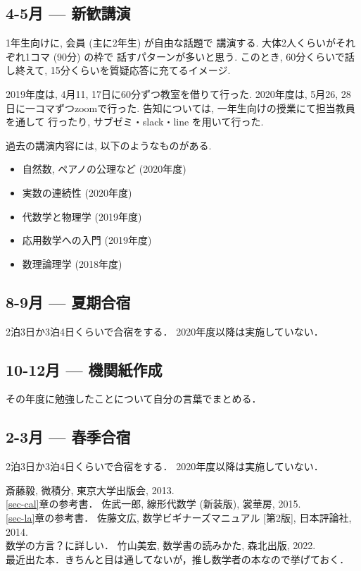 \documentclass[11pt, a4paper, dvipdfmx]{jsarticle}
\theoremstyle{definition}
\theoremstyle{mystyle}
\numberwithin{equation}{section} %
\begin{document}
\subsection*{4-5月 --- 新歓講演}

1年生向けに, 会員 (主に2年生) が自由な話題で
講演する. 
大体2人くらいがそれぞれ1コマ (90分) の枠で
話すパターンが多いと思う. 
このとき, 60分くらいで話し終えて, 
15分くらいを質疑応答に充てるイメージ. 

2019年度は, 4月11, 17日に60分ずつ教室を借りて行った. 
2020年度は, 5月26, 28日に一コマずつzoomで行った. 
告知については, 一年生向けの授業にて担当教員を通して
行ったり, サブゼミ・slack・line を用いて行った. 

過去の講演内容には, 以下のようなものがある. 
\begin{itemize}
    \item 自然数, ペアノの公理など (2020年度) 
    \item 実数の連続性 (2020年度) 
    \item 代数学と物理学 (2019年度) 
    \item 応用数学への入門 (2019年度)
    \item 数理論理学 (2018年度)
\end{itemize}

\subsection*{8-9月 --- 夏期合宿}

2泊3日か3泊4日くらいで合宿をする．
2020年度以降は実施していない．

\subsection*{10-12月 --- 機関紙作成}

その年度に勉強したことについて自分の言葉でまとめる．

\subsection*{2-3月 --- 春季合宿}

2泊3日か3泊4日くらいで合宿をする．
2020年度以降は実施していない．



\begin{thebibliography}{15}
     斎藤毅, 微積分, 東京大学出版会, 2013.\\
    \ref{sec-cal}章の参考書．
     佐武一郎, 線形代数学 (新装版), 裳華房, 2015.\\
    \ref{sec-la}章の参考書．
     佐藤文広, 数学ビギナーズマニュアル [第2版], 日本評論社, 2014.\\
    数学の方言？に詳しい．
     竹山美宏, 数学書の読みかた, 森北出版, 2022.\\
    最近出た本．きちんと目は通してないが，推し数学者の本なので挙げておく．
\end{thebibliography}
\end{document}
